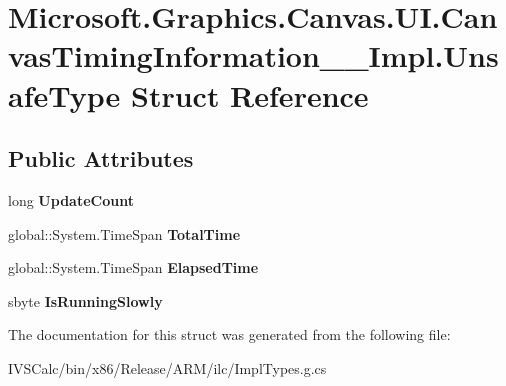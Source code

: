 \hypertarget{struct_microsoft_1_1_graphics_1_1_canvas_1_1_u_i_1_1_canvas_timing_information_____impl_1_1_unsafe_type}{}\section{Microsoft.\+Graphics.\+Canvas.\+U\+I.\+Canvas\+Timing\+Information\+\_\+\+\_\+\+Impl.\+Unsafe\+Type Struct Reference}
\label{struct_microsoft_1_1_graphics_1_1_canvas_1_1_u_i_1_1_canvas_timing_information_____impl_1_1_unsafe_type}
\subsection*{Public Attributes}
\begin{DoxyCompactItemize}
\item 
\mbox{\label{struct_microsoft_1_1_graphics_1_1_canvas_1_1_u_i_1_1_canvas_timing_information_____impl_1_1_unsafe_type_aacf6fc6cacb50d6cb81312e228ba7c26}} 
long {\bfseries Update\+Count}
\item 
\mbox{\label{struct_microsoft_1_1_graphics_1_1_canvas_1_1_u_i_1_1_canvas_timing_information_____impl_1_1_unsafe_type_a01cc24007fbf0f22dad9b2f0a368823f}} 
global\+::\+System.\+Time\+Span {\bfseries Total\+Time}
\item 
\mbox{\label{struct_microsoft_1_1_graphics_1_1_canvas_1_1_u_i_1_1_canvas_timing_information_____impl_1_1_unsafe_type_a93fb5d79a5f201ec80192ffddf90a0d2}} 
global\+::\+System.\+Time\+Span {\bfseries Elapsed\+Time}
\item 
\mbox{\label{struct_microsoft_1_1_graphics_1_1_canvas_1_1_u_i_1_1_canvas_timing_information_____impl_1_1_unsafe_type_ad2023be0871babf2b0eb645f6dbfe55a}} 
sbyte {\bfseries Is\+Running\+Slowly}
\end{DoxyCompactItemize}


The documentation for this struct was generated from the following file\+:\begin{DoxyCompactItemize}
\item 
I\+V\+S\+Calc/bin/x86/\+Release/\+A\+R\+M/ilc/Impl\+Types.\+g.\+cs\end{DoxyCompactItemize}
